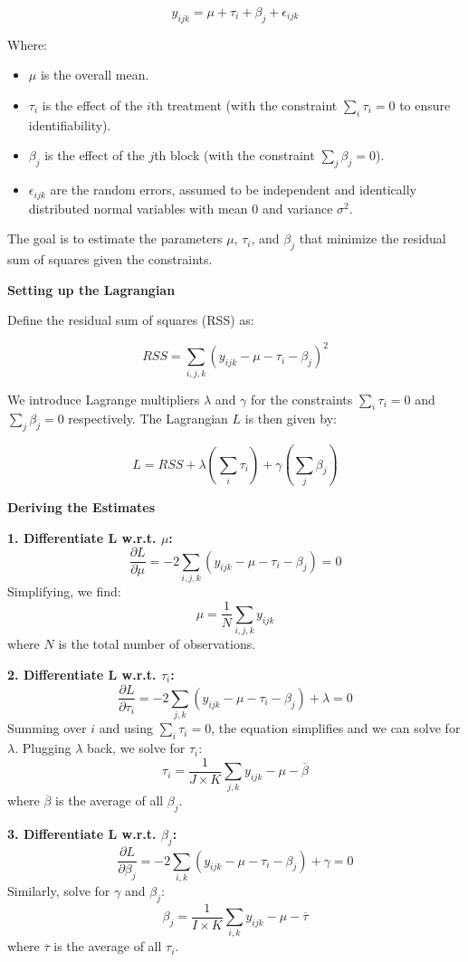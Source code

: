 \documentclass[8pt]{article}
\begin{document}
{\[
y_{ijk} = \mu + \tau_i + \beta_j + \epsilon_{ijk}
\]

Where:
\begin{itemize}
    \item \(\mu\) is the overall mean.
    \item \(\tau_i\) is the effect of the \(i\)th treatment (with the constraint \(\sum_i \tau_i = 0\) to ensure identifiability).
    \item \(\beta_j\) is the effect of the \(j\)th block (with the constraint \(\sum_j \beta_j = 0\)).
    \item \(\epsilon_{ijk}\) are the random errors, assumed to be independent and identically distributed normal variables with mean 0 and variance \(\sigma^2\).
\end{itemize}

The goal is to estimate the parameters \(\mu\), \(\tau_i\), and \(\beta_j\) that minimize the residual sum of squares given the constraints.

\textbf{Setting up the Lagrangian}

Define the residual sum of squares (RSS) as:

\[
RSS = \sum_{i,j,k} (y_{ijk} - \mu - \tau_i - \beta_j)^2
\]

We introduce Lagrange multipliers \(\lambda\) and \(\gamma\) for the constraints \(\sum_i \tau_i = 0\) and \(\sum_j \beta_j = 0\) respectively. The Lagrangian \(L\) is then given by:

\[
L = RSS + \lambda \left(\sum_i \tau_i\right) + \gamma \left(\sum_j \beta_j\right)
\]

\textbf{Deriving the Estimates}

\textbf{1. Differentiate L w.r.t. \(\mu\):}
   \[
   \frac{\partial L}{\partial \mu} = -2 \sum_{i,j,k} (y_{ijk} - \mu - \tau_i - \beta_j) = 0
   \]
   Simplifying, we find:
   \[
   \mu = \frac{1}{N} \sum_{i,j,k} y_{ijk}
   \]
   where \(N\) is the total number of observations.

\textbf{2. Differentiate L w.r.t. \(\tau_i\):}
   \[
   \frac{\partial L}{\partial \tau_i} = -2 \sum_{j,k} (y_{ijk} - \mu - \tau_i - \beta_j) + \lambda = 0
   \]
   Summing over \(i\) and using \(\sum_i \tau_i = 0\), the equation simplifies and we can solve for \(\lambda\). Plugging \(\lambda\) back, we solve for \(\tau_i\):
   \[
   \tau_i = \frac{1}{J \times K} \sum_{j,k} y_{ijk} - \mu - \overline{\beta}
   \]
   where \(\overline{\beta}\) is the average of all \(\beta_j\).

\textbf{3. Differentiate L w.r.t. \(\beta_j\):}
   \[
   \frac{\partial L}{\partial \beta_j} = -2 \sum_{i,k} (y_{ijk} - \mu - \tau_i - \beta_j) + \gamma = 0
   \]
   Similarly, solve for \(\gamma\) and \(\beta_j\):
   \[
   \beta_j = \frac{1}{I \times K} \sum_{i,k} y_{ijk} - \mu - \overline{\tau}
   \]
   where \(\overline{\tau}\) is the average of all \(\tau_i\).

}
\end{document}
